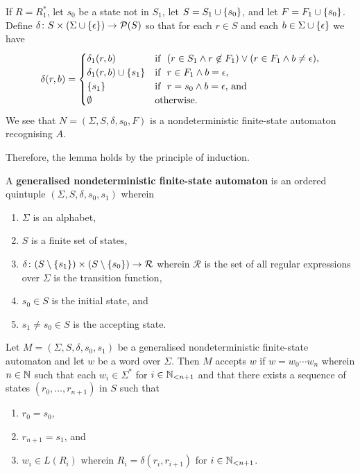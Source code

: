     If \(R = R_1^*\), let \(s_0\) be a state not in \(S_1\), let \(S = S_1 \cup
    \set{s_0}\), and let \(F = F_1 \cup \set{s_0}\). Define \(\map{\delta}{S
    \times (\Sigma \cup \set{\epsilon})}{\pow(S)}\) so that for each \(r \in S\)
    and each \(b \in \Sigma \cup \set{\epsilon}\) we have
    \[
        \delta(r, b) = \begin{cases}
            \delta_1(r, b) & \text{if }\ (r \in S_1 \land r \not\in F_1) \lor (r
            \in F_1 \land b \neq \epsilon),\\
            \delta_1(r, b) \cup \set{s_1} & \text{if }\ r \in F_1 \land b =
            \epsilon,\\
            \set{s_1} & \text{if }\ r = s_0 \land b = \epsilon \text{, and}\\
            \nset & \text{otherwise.}
        \end{cases}
    \]
    We see that \(N = (\Sigma, S, \delta, s_0, F)\) is a nondeterministic
    finite-state automaton recognising \(A\).

    Therefore, the lemma holds by the principle of induction.
\Epr

\Bdf
    A {\bf generalised nondeterministic finite-state automaton} is an ordered
    quintuple \((\Sigma, S, \delta, s_0, s_1)\) wherein
    \begin{enumerate}
        \item \(\Sigma\) is an alphabet,
        \item \(S\) is a finite set of states,
        \item \(\map{\delta}{(S \setminus \set{s_1}) \times (S \setminus
        \set{s_0})}{\mathcal{R}}\) wherein \(\mathcal{R}\) is the set of all
        regular expressions over \(\Sigma\) is the transition function,
        \item \(s_0 \in S\) is the initial state, and
        \item \(s_1 \neq s_0 \in S\) is the accepting state.
    \end{enumerate}
\Edf

Let \(M = (\Sigma, S, \delta, s_0, s_1)\) be a generalised nondeterministic
finite-state automaton and let \(w\) be a word over \(\Sigma\). Then \(M\)
accepts \(w\) if \(w = w_0 \cdots w_n\) wherein \(n \in \setnat\) such that each
\(w_i \in \Sigma^*\) for \(i \in \Nln[n + 1]\) and that there exists a sequence
of states \((r_0, \ldots, r_{n + 1})\) in \(S\) such that
\begin{enumerate}
    \item \(r_0 = s_0\),
    \item \(r_{n + 1} = s_1\), and
    \item \(w_i \in L(R_i)\) wherein \(R_i = \delta(r_i, r_{i + 1})\) for \(i
    \in \Nln[n + 1]\).
\end{enumerate}

